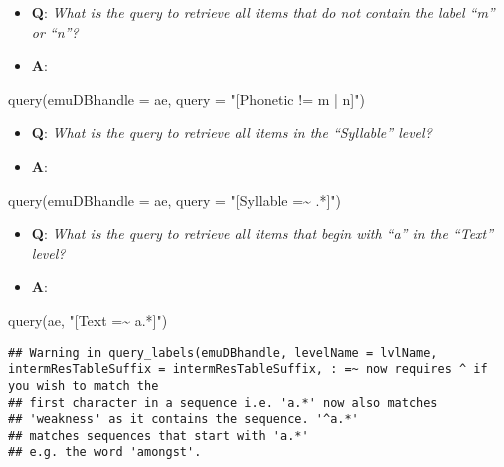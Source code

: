 \documentclass[
]{book}
\newenvironment{Shaded}{\begin{snugshade}}{\end{snugshade}}
\newcommand{\AttributeTok}[1]{\textcolor[rgb]{0.77,0.63,0.00}{#1}}
\newcommand{\FunctionTok}[1]{\textcolor[rgb]{0.00,0.00,0.00}{#1}}
\newcommand{\NormalTok}[1]{#1}
\newcommand{\StringTok}[1]{\textcolor[rgb]{0.31,0.60,0.02}{#1}}
\providecommand{\tightlist}{%
  \setlength{\itemsep}{0pt}\setlength{\parskip}{0pt}}
\begin{document}
\begin{itemize}
\tightlist
\item
  \textbf{Q}: \emph{What is the query to retrieve all items that do not contain the label ``m'' or ``n''?}
\item
  \textbf{A}:
\end{itemize}

\begin{Shaded}
\begin{Highlighting}[]
\FunctionTok{query}\NormalTok{(}\AttributeTok{emuDBhandle =}\NormalTok{ ae, }
      \AttributeTok{query =} \StringTok{"[Phonetic != m | n]"}\NormalTok{)}
\end{Highlighting}
\end{Shaded}

\begin{itemize}
\tightlist
\item
  \textbf{Q}: \emph{What is the query to retrieve all items in the ``Syllable'' level?}
\item
  \textbf{A}:
\end{itemize}

\begin{Shaded}
\begin{Highlighting}[]
\FunctionTok{query}\NormalTok{(}\AttributeTok{emuDBhandle =}\NormalTok{ ae, }
      \AttributeTok{query =} \StringTok{"[Syllable =\textasciitilde{} .*]"}\NormalTok{)}
\end{Highlighting}
\end{Shaded}

\begin{itemize}
\tightlist
\item
  \textbf{Q}: \emph{What is the query to retrieve all items that begin with ``a'' in the ``Text'' level?}
\item
  \textbf{A}:
\end{itemize}

\begin{Shaded}
\begin{Highlighting}[]
\FunctionTok{query}\NormalTok{(ae, }\StringTok{"[Text =\textasciitilde{} a.*]"}\NormalTok{)}
\end{Highlighting}
\end{Shaded}

\begin{verbatim}
## Warning in query_labels(emuDBhandle, levelName = lvlName, intermResTableSuffix = intermResTableSuffix, : =~ now requires ^ if you wish to match the
## first character in a sequence i.e. 'a.*' now also matches
## 'weakness' as it contains the sequence. '^a.*'
## matches sequences that start with 'a.*'
## e.g. the word 'amongst'.
\end{verbatim}
\end{document}
